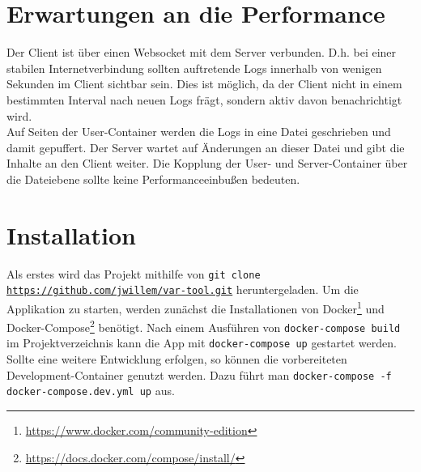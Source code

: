 \section{Erwartungen an die Performance}
Der Client ist über einen Websocket mit dem Server verbunden.
D.h. bei einer stabilen Internetverbindung sollten auftretende Logs innerhalb von wenigen Sekunden im Client sichtbar sein.
Dies ist möglich, da der Client nicht in einem bestimmten Interval nach neuen Logs frägt, sondern aktiv davon benachrichtigt wird.
\\
Auf Seiten der User-Container werden die Logs in eine Datei geschrieben und damit gepuffert.
Der Server wartet auf Änderungen an dieser Datei und gibt die Inhalte an den Client weiter.
Die Kopplung der User- und Server-Container über die Dateiebene sollte keine Performanceeinbußen bedeuten.
\section{Installation}
Als erstes wird das Projekt mithilfe von \texttt{git clone \url{https://github.com/jwillem/var-tool.git}} heruntergeladen.
Um die Applikation zu starten, werden zunächst die Installationen von Docker\footnote{\url{https://www.docker.com/community-edition}} und Docker-Compose\footnote{\url{https://docs.docker.com/compose/install/}} benötigt.
Nach einem Ausführen von \texttt{docker-compose build} im Projektverzeichnis kann die App mit \texttt{docker-compose up} gestartet werden.
\\
Sollte eine weitere Entwicklung erfolgen, so können die vorbereiteten Development-Container genutzt werden.
Dazu führt man \texttt{docker-compose -f docker-compose\break .dev.yml up} aus.

